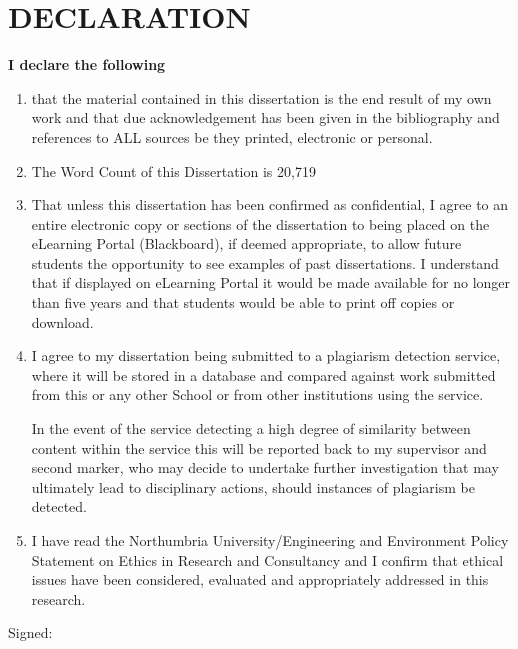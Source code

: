 \chapter{DECLARATION}

\textbf{\large{I declare the following}}
\begin{enumerate}
	\item that the material contained in this dissertation is the end result of my own work and that
	due acknowledgement has been given in the bibliography and references to ALL sources be
	they printed, electronic or personal.
	
	\item The Word Count of this Dissertation is 20,719
	
	\item That unless this dissertation has been confirmed as confidential, I agree to an entire
	electronic copy or sections of the dissertation to being placed on the eLearning Portal
	(Blackboard), if deemed appropriate, to allow future students the opportunity to see examples
	of past dissertations. I understand that if displayed on eLearning Portal it would be made
	available for no longer than five years and that students would be able to print off copies or
	download.
	
	\item I agree to my dissertation being submitted to a plagiarism detection service, where it will
	be stored in a database and compared against work submitted from this or any other School
	or from other institutions using the service.
	
	In the event of the service detecting a high degree of similarity between content within the
	service this will be reported back to my supervisor and second marker, who may decide to
	undertake further investigation that may ultimately lead to disciplinary actions, should
	instances of plagiarism be detected.
	
	\item I have read the Northumbria University/Engineering and Environment Policy Statement on
	Ethics in Research and Consultancy and I confirm that ethical issues have been considered,
	evaluated and appropriately addressed in this research. \\ 
\end{enumerate}


Signed: \hrulefill \\

\hspace*{0mm}\phantom{Signed: }




